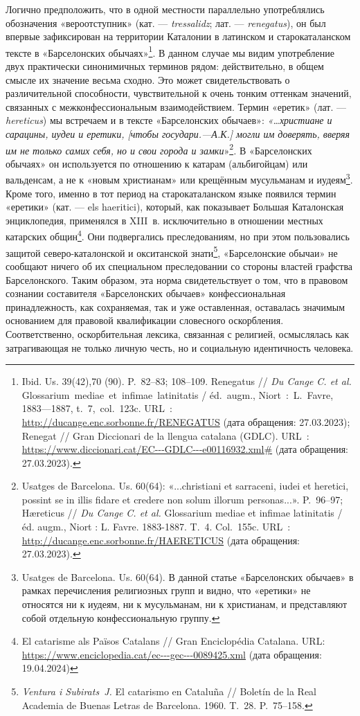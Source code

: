 Логично предположить, что в одной местности параллельно употреблялись обозначения «вероотступник» (кат. --- \emph{tressalidz}; лат. --- \emph{renegatus}), он был впервые зафиксирован на территории Каталонии в латинском и старокаталанском тексте в «Барселонских обычаях»\footnote{Ibid. Us. 39(42),70 (90). P.~82--83; 108--109. Renegatus // \emph{Du Cange C. et al. }Glossarium~mediae~et~infimae~latinitatis / éd.~augm., Niort~:~L.~Favre, 1883---1887, t.~7,~col.~123c. URL~: \url{http://ducange.enc.sorbonne.fr/RENEGATUS} (дата обращения: 27.03.2023); Renegat // Gran Diccionari de la llengua catalana (GDLC). URL~: \url{https://www.diccionari.cat/EC---GDLC---e00116932.xml\#} (дата обращения: 27.03.2023).}. В данном случае мы видим употребление двух практически синонимичных терминов рядом: действительно, в общем смысле их значение весьма сходно. Это может свидетельствовать о различительной способности, чувствительной к очень тонким оттенкам значений, связанных с межконфессиональным взаимодействием. Термин «еретик» (лат. --- \emph{hereticus}) мы встречаем и в тексте «Барселонских обычаев»: \emph{«…христиане и сарацины, иудеи и еретики, [чтобы государи.---А.К.] могли им доверять, вверяя им не только самих себя, но и свои города и замки}»\footnote{Usatges de Barcelona. Us. 60(64): «...christiani et sarraceni, iudei et heretici, possint se in illis fidare et credere non solum illorum personas...». P.~96--97; Hæreticus //\emph{ Du Cange C. et al. }Glossarium mediae et infimae latinitatis / éd. augm., Niort : L. Favre. 1883-1887. T.~4. Col.~155c. URL~: \url{http://ducange.enc.sorbonne.fr/HAERETICUS} (дата обращения: 27.03.2023).}\emph{.} В «Барселонских обычаях» он используется по отношению к катарам (альбигойцам) или вальденсам, а не к «новым христианам» или крещённым мусульманам и иудеям\footnote{Usatges de Barcelona. Us. 60(64). В данной статье «Барселонских обычаев» в рамках перечисления религиозных групп и видно, что «еретики» не относятся ни к иудеям, ни к мусульманам, ни к христианам, и представляют собой отдельную конфессиональную группу.}. Кроме того, именно в тот период на старокаталанском языке появился термин «еретики» (кат. --- els haeritici), который, как показывает Большая Каталонская энциклопедия, применялся в XIII~в. исключительно в отношении местных катарских общин\footnote{El catarisme als Països Catalans // Gran Enciclopédia Catalana. URL: \url{https://www.enciclopedia.cat/ec---gec---0089425.xml} (дата обращения: 19.04.2024)}. Они подвергались преследованиям, но при этом пользовались защитой северо-каталонской и окситанской знати\footnote{\emph{Ventura i Subirats~J. }El catarismo en Cataluña // Boletín de la Real Academia de Buenas Letras de Barcelona. 1960. T.~28. P.~75--158.}, «Барселонские обычаи» не сообщают ничего об их специальном преследовании со стороны властей графства Барселонского. Таким образом, эта норма свидетельствует о том, что в правовом сознании составителя «Барселонских обычаев» конфессиональная принадлежность, как сохраняемая, так и уже оставленная, оставалась значимым основанием для правовой квалификации словесного оскорбления. Соответственно, оскорбительная лексика, связанная с религией, осмыслялась как затрагивающая не только личную честь, но и социальную идентичность человека.

